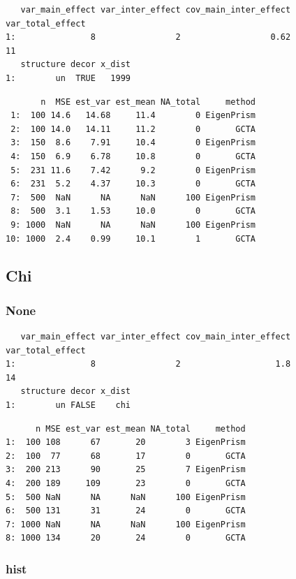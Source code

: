 \documentclass[]{article}
\begin{document}
\begin{verbatim}
   var_main_effect var_inter_effect cov_main_inter_effect var_total_effect
1:               8                2                  0.62               11
   structure decor x_dist
1:        un  TRUE   1999
\end{verbatim}

\begin{verbatim}
       n  MSE est_var est_mean NA_total     method
 1:  100 14.6   14.68     11.4        0 EigenPrism
 2:  100 14.0   14.11     11.2        0       GCTA
 3:  150  8.6    7.91     10.4        0 EigenPrism
 4:  150  6.9    6.78     10.8        0       GCTA
 5:  231 11.6    7.42      9.2        0 EigenPrism
 6:  231  5.2    4.37     10.3        0       GCTA
 7:  500  NaN      NA      NaN      100 EigenPrism
 8:  500  3.1    1.53     10.0        0       GCTA
 9: 1000  NaN      NA      NaN      100 EigenPrism
10: 1000  2.4    0.99     10.1        1       GCTA
\end{verbatim}

\subsection{Chi}\label{chi}

\subsubsection{None}\label{none-1}

\begin{verbatim}
   var_main_effect var_inter_effect cov_main_inter_effect var_total_effect
1:               8                2                   1.8               14
   structure decor x_dist
1:        un FALSE    chi
\end{verbatim}

\begin{verbatim}
      n MSE est_var est_mean NA_total     method
1:  100 108      67       20        3 EigenPrism
2:  100  77      68       17        0       GCTA
3:  200 213      90       25        7 EigenPrism
4:  200 189     109       23        0       GCTA
5:  500 NaN      NA      NaN      100 EigenPrism
6:  500 131      31       24        0       GCTA
7: 1000 NaN      NA      NaN      100 EigenPrism
8: 1000 134      20       24        0       GCTA
\end{verbatim}

\subsubsection{hist}\label{hist}
\end{document}
